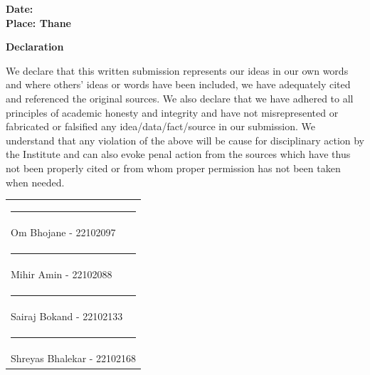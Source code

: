 \documentclass[12pt,a4paper,oneside,openany]{book}
\begin{document}
\vspace{18mm}

\noindent
\textbf{Date:} \\[6mm]

\noindent
\textbf{Place: Thane}

\clearpage
\thispagestyle{empty}

\begin{center}
  {\fontsize{16}{18}\selectfont\bfseries Declaration}\\[10mm]
\end{center}

\noindent
{\fontsize{11}{14}\selectfont
We declare that this written submission represents our ideas in our own words and where others' ideas or words have been included, we have adequately cited and referenced the original sources. We also declare that we have adhered to all principles of academic honesty and integrity and have not misrepresented or fabricated or falsified any idea/data/fact/source in our submission. We understand that any violation of the above will be cause for disciplinary action by the Institute and can also evoke penal action from the sources which have thus not been properly cited or from whom proper permission has not been taken when needed.
}

\vspace{20mm}


\begin{flushright}

\begin{tabular}{l}

\rule{5.5cm}{0.4pt} \\
\vspace{1cm}
Om Bhojane - 22102097 \\[12mm]

\rule{5.5cm}{0.4pt} \\
\vspace{0.8cm}
Mihir Amin - 22102088 \\[12mm]

\rule{5.5cm}{0.4pt} \\
\vspace{0.8cm}
Sairaj Bokand - 22102133 \\[12mm]

\rule{5.5cm}{0.4pt} \\
Shreyas Bhalekar - 22102168 \\

\end{tabular}

\end{flushright}
\end{document}
